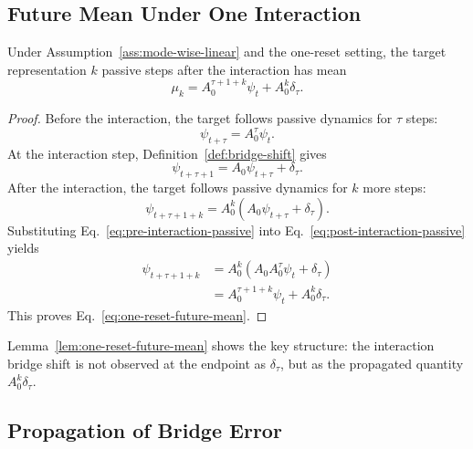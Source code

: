 \subsection{Future Mean Under One Interaction}

\begin{lemma}
\label{lem:one-reset-future-mean}
Under Assumption~\ref{ass:mode-wise-linear} and the one-reset setting, the target representation $k$ passive steps after
the interaction has mean
\begin{equation}
    \mu_k
    =
    A_0^{\tau+1+k}\psi_t
    +
    A_0^k\delta_\tau .
    \label{eq:one-reset-future-mean}
\end{equation}
\end{lemma}

\begin{proof}
Before the interaction, the target follows passive dynamics for $\tau$ steps:
\begin{equation}
    \psi_{t+\tau}
    =
    A_0^\tau\psi_t .
    \label{eq:pre-interaction-passive}
\end{equation}
At the interaction step, Definition~\ref{def:bridge-shift} gives
\begin{equation}
    \psi_{t+\tau+1}
    =
    A_0\psi_{t+\tau}
    +
    \delta_\tau .
    \label{eq:interaction-update-with-shift}
\end{equation}
After the interaction, the target follows passive dynamics for $k$ more steps:
\begin{equation}
    \psi_{t+\tau+1+k}
    =
    A_0^k
    \left(
        A_0\psi_{t+\tau}
        +
        \delta_\tau
    \right).
    \label{eq:post-interaction-passive}
\end{equation}
Substituting Eq.~\eqref{eq:pre-interaction-passive} into Eq.~\eqref{eq:post-interaction-passive}
yields
\begin{align}
    \psi_{t+\tau+1+k}
    &=
    A_0^k
    \left(
        A_0A_0^\tau\psi_t
        +
        \delta_\tau
    \right) \\
    &=
    A_0^{\tau+1+k}\psi_t
    +
    A_0^k\delta_\tau .
\end{align}
This proves Eq.~\eqref{eq:one-reset-future-mean}.
\end{proof}

Lemma~\ref{lem:one-reset-future-mean} shows the key structure: the interaction bridge shift is
not observed at the endpoint as $\delta_\tau$, but as the propagated quantity $A_0^k\delta_\tau$.

\subsection{Propagation of Bridge Error}

